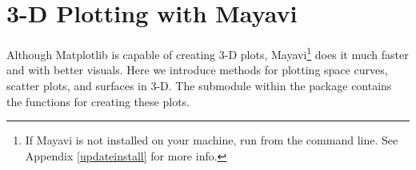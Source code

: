 
\section*{3-D Plotting with Mayavi} %

Although Matplotlib is capable of creating 3-D plots, Mayavi\footnote{If Mayavi is not installed on your machine, run  from the command line. See Appendix \ref{updateinstall} for more info.} does it much faster and with better visuals.
Here we introduce methods for plotting space curves, scatter plots, and surfaces in 3-D.
The  submodule within the  package contains the functions for creating these plots.

